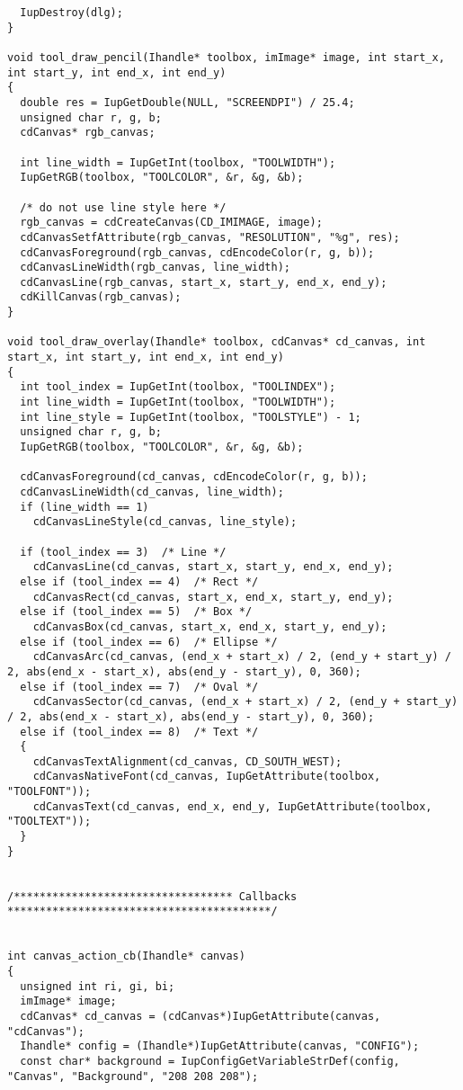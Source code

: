 \documentclass{ctexart}
\begin{document}
\begin{lstlisting}
  IupDestroy(dlg);
}

void tool_draw_pencil(Ihandle* toolbox, imImage* image, int start_x, int start_y, int end_x, int end_y)
{
  double res = IupGetDouble(NULL, "SCREENDPI") / 25.4;
  unsigned char r, g, b;
  cdCanvas* rgb_canvas;
  
  int line_width = IupGetInt(toolbox, "TOOLWIDTH");
  IupGetRGB(toolbox, "TOOLCOLOR", &r, &g, &b);

  /* do not use line style here */
  rgb_canvas = cdCreateCanvas(CD_IMIMAGE, image);
  cdCanvasSetfAttribute(rgb_canvas, "RESOLUTION", "%g", res);
  cdCanvasForeground(rgb_canvas, cdEncodeColor(r, g, b));
  cdCanvasLineWidth(rgb_canvas, line_width);
  cdCanvasLine(rgb_canvas, start_x, start_y, end_x, end_y);
  cdKillCanvas(rgb_canvas);
}

void tool_draw_overlay(Ihandle* toolbox, cdCanvas* cd_canvas, int start_x, int start_y, int end_x, int end_y)
{
  int tool_index = IupGetInt(toolbox, "TOOLINDEX");
  int line_width = IupGetInt(toolbox, "TOOLWIDTH");
  int line_style = IupGetInt(toolbox, "TOOLSTYLE") - 1;
  unsigned char r, g, b;
  IupGetRGB(toolbox, "TOOLCOLOR", &r, &g, &b);

  cdCanvasForeground(cd_canvas, cdEncodeColor(r, g, b));
  cdCanvasLineWidth(cd_canvas, line_width);
  if (line_width == 1)
    cdCanvasLineStyle(cd_canvas, line_style);

  if (tool_index == 3)  /* Line */
    cdCanvasLine(cd_canvas, start_x, start_y, end_x, end_y);
  else if (tool_index == 4)  /* Rect */
    cdCanvasRect(cd_canvas, start_x, end_x, start_y, end_y);
  else if (tool_index == 5)  /* Box */
    cdCanvasBox(cd_canvas, start_x, end_x, start_y, end_y);
  else if (tool_index == 6)  /* Ellipse */
    cdCanvasArc(cd_canvas, (end_x + start_x) / 2, (end_y + start_y) / 2, abs(end_x - start_x), abs(end_y - start_y), 0, 360);
  else if (tool_index == 7)  /* Oval */
    cdCanvasSector(cd_canvas, (end_x + start_x) / 2, (end_y + start_y) / 2, abs(end_x - start_x), abs(end_y - start_y), 0, 360);
  else if (tool_index == 8)  /* Text */
  {
    cdCanvasTextAlignment(cd_canvas, CD_SOUTH_WEST);
    cdCanvasNativeFont(cd_canvas, IupGetAttribute(toolbox, "TOOLFONT"));
    cdCanvasText(cd_canvas, end_x, end_y, IupGetAttribute(toolbox, "TOOLTEXT"));
  }
}


/********************************** Callbacks *****************************************/


int canvas_action_cb(Ihandle* canvas)
{
  unsigned int ri, gi, bi;
  imImage* image;
  cdCanvas* cd_canvas = (cdCanvas*)IupGetAttribute(canvas, "cdCanvas");
  Ihandle* config = (Ihandle*)IupGetAttribute(canvas, "CONFIG");
  const char* background = IupConfigGetVariableStrDef(config, "Canvas", "Background", "208 208 208");


\end{lstlisting}
\end{document}
